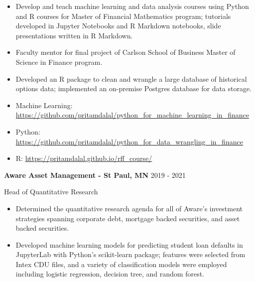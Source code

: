 \documentclass[11pt,a4paper,]{awesome-cv}
\begin{document}
\begin{itemize}
\item
  Develop and teach machine learning and data analysis courses using
  Python and R courses for Master of Financial Mathematics program;
  tutorials developed in Jupyter Notebooks and R Markdown notebooks,
  slide presentations written in R Markdown. \vspace{-0.5ex}
\item
  Faculty mentor for final project of Carlson School of Business Master
  of Science in Finance program. \vspace{-0.5ex}
\item
  Developed an R package to clean and wrangle a large database of
  historical options data; implemented an on-premise Postgres database
  for data storage. \vspace{-0.5ex}
\item
  Machine Learning:
  \href{https://github.com/pritamdalal/python\_for\_machine\_learning\_in\_finance}{https://github.com/pritamdalal/python\_for\_machine\_learning\_in\_finance}
  \vspace{-0.5ex}
\item
  Python:
  \href{https://github.com/pritamdalal/python\_for\_data\_wrangling\_in\_finance}{https://github.com/pritamdalal/python\_for\_data\_wrangling\_in\_finance}
  \vspace{-0.5ex}
\item
  R:
  \href{https://pritamdalal.github.io/rff\_course/}{https://pritamdalal.github.io/rff\_course/}
  \vspace{-0.5ex}
\end{itemize}

\normalsize

\textbf{Aware Asset Management - St Paul, MN} \hfill 2019 - 2021

\vspace{-1ex}

Head of Quantitative Research

\vspace{-1.5ex}

\small

\begin{itemize}
\item
  Determined the quantitative research agenda for all of Aware's
  investment strategies spanning corporate debt, mortgage backed
  securities, and asset backed securities. \vspace{-0.5ex}
\item
  Developed machine learning models for predicting student loan defaults
  in JupyterLab with Python's scikit-learn package; features were
  selected from Intex CDU files, and a variety of classification models
  were employed including logistic regression, decision tree, and random
  forest. \vspace{-2ex}
\end{itemize}
\end{document}
